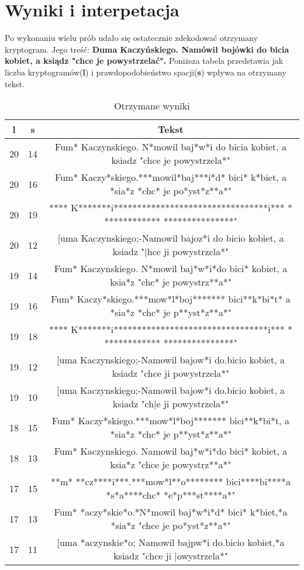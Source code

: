 \documentclass[a4paper,14pt]{report}
\begin{document}
\section{Wyniki i interpetacja}
	Po wykonaniu wielu prób udało się ostatecznie zdekodować otrzymany kryptogram. Jego treść: \textbf{Duma Kaczyńskiego. Namówił bojówki do bicia kobiet, a ksiądz "chce je powystrzelać".}
	Poniższa tabela przedstawia jak liczba kryptogramów(\textbf{l}) i prawdopodobieństwo spacji(\textbf{s}) wpływa na otrzymany tekst.
	\begin{table}[H]
    \centering
    \begin{tabular}{|c | c | c |} 
     \hline
     l & s & Tekst \\ [0.5ex] 
     \hline\hline
     20 & 14 & Fum* Kaczynskiego. N*mowil baj*w*i do bicia kobiet, a ksiadz "chce je powystrzela*" \\
     20 & 16 & Fum* Kaczy*skiego.***mowil*baj***i*d* bici* k*biet, a *sia*z *chc* je po*yst*z**a*" \\
     20 & 19 & **** K*******i*********************************i*** * ************ ***************"\\
     20 & 12 & [uma Kaczynskiego;-Namowil bajoz*i do bicio kobiet, a ksiadz "|hce ji powystrzela*" \\
     19 & 14 & Fum* Kaczynskiego. N*mowil baj*w*i*do bici* kobiet, a ksia*z "chc* je powystrz**a*"\\
     19 & 16 & Fum* Kaczy*skiego.***mow*l*boj******* bici**k*bi*t* a *sia*z *chc* je p**yst*z**a*"\\
     19 & 18 & **** K*******i*********************************i*** * ************ ***************"\\
     19 & 12 & [uma Kaczynskiego;-Namowil bajow*i do.bicio kobiet, a ksiadz "chce ji powystrzela*" \\
     19 & 10 & [uma Kaczynskiego;-Namowil bajow*i do.bicio kobiet, a ksiadz "ch|e ji powystrzela*"\\
     18 & 15 & Fum* Kaczy*skiego.***mow*l*boj******* bici**k*bi*t, a *sia*z *chc* je p**yst*z**a*" \\
     18 & 13 & Fum* Kaczynskiego. Namowil baj*w*i*do bici* kobiet, a ksia*z "chce je powystrz**a*"\\
     17 & 15 & **m* **cz****i***.***mow*l**o******** bici****bi****a *s*a****chc* *e*p***st****a*"\\
     17 & 13 & Fum* *aczy*skie*o.*N*mowil baj*w*i*d* bici* k*biet,*a *sia*z "chce je po*yst*z**a*" \\
     17 & 11 & [uma *aczynskie*o; Namowil bajpw*i do.bicio kobiet,*a ksiadz "chce ji |owystrzela*" \\
     \hline
    \end{tabular}
    \caption{Otrzymane wyniki}
    \label{Wyniki}
    \end{table}
\end{document}
